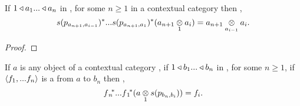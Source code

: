 \begin{lemma}
If $1 \base a_1 ... \base a_n$ in \catc, for some $n \ge 1$ in a contextual category \catc then \foreachi,
\begin{equation*}
s(p_{a_{n+1},a_{i-1}})^*...s(p_{a_{n+1},a_1})^*(\crossx{a_{n+1}}{a_i}{1}) 
= \crossx{a_{n+1}}{a_i}{a_{i-1}}.
\end{equation*} 
\end{lemma}
\begin{proof}
\end{proof}


\begin{lemma}
If $a$ is any object of a contextual category \catcw, if $1 \base b_1 ... \base b_n$ in \catc, for some $n \ge 1$, 
if $\tuple{\fn}$ is a  from $a$ to $b_n$ then \foreachi,
\begin{equation}
\fnvectorstar(\crossx{a}{s(p_{b_n,b_i})}{1})=f_i.                                    
\end{equation}
\end{lemma}

